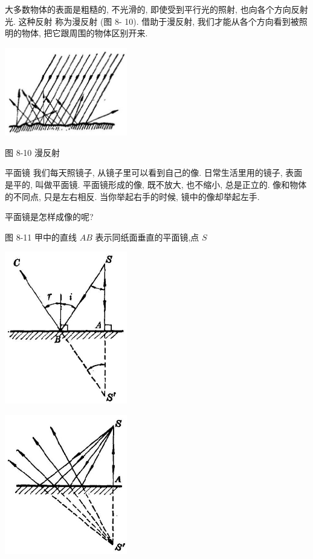 \documentclass[10pt]{article}
\begin{document}
大多数物体的表面是粗糙的, 不光滑的, 即使受到平行光的照射, 也向各个方向反射光. 这种反射 称为漫反射 (图 8- 10). 借助于漫反射, 我们才能从各个方向看到被照明的物体, 把它跟周围的物体区别开来.

\begin{center}
\includegraphics[max width=0.4\textwidth]{images/01913056-1f15-74d8-9184-9aab52c9d66b_251_317832.jpg}
\end{center}

图 8-10 漫反射

平面镜 我们每天照镜子, 从镜子里可以看到自己的像. 日常生活里用的镜子, 表面是平的, 叫做平面镜. 平面镜形成的像, 既不放大, 也不缩小, 总是正立的. 像和物体的不同点, 只是左右相反. 当你举起右手的时候, 镜中的像却举起左手.

平面镜是怎样成像的呢?

图 8-11 甲中的直线 \({AB}\) 表示同纸面垂直的平面镜,点 \(S\)

\begin{center}
\includegraphics[max width=0.4\textwidth]{images/01913056-1f15-74d8-9184-9aab52c9d66b_251_585444.jpg}
\end{center}

\begin{center}
\includegraphics[max width=0.4\textwidth]{images/01913056-1f15-74d8-9184-9aab52c9d66b_251_851723.jpg}
\end{center}
\end{document}
